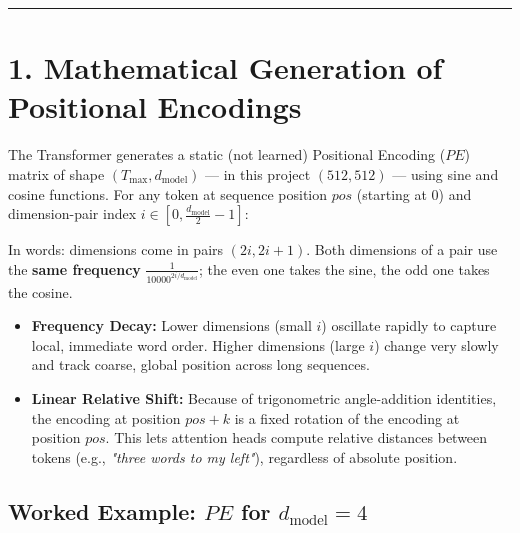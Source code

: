 \documentclass[11pt,a4paper,oneside]{report}
\providecommand{\tightlist}{\setlength{\itemsep}{0pt}\setlength{\parskip}{0pt}}
\begin{document}
\begin{center}\rule{0.5\linewidth}{0.5pt}\end{center}

\section{1. Mathematical Generation of Positional Encodings}\label{1-mathematical-generation-of-positional-encodings}

The Transformer generates a static (not learned) Positional Encoding (\(PE\)) matrix of shape \((T_{\max}, d_{\text{model}})\) --- in this project \((512, 512)\) --- using sine and cosine functions. For any token at sequence position \(pos\) (starting at \(0\)) and dimension-pair index \(i \in \left[0, \frac{d_{\text{model}}}{2} - 1\right]\):

\begin{center}\end{center}

\begin{center}\end{center}

In words: dimensions come in pairs \((2i, 2i+1)\). Both dimensions of a pair use the \textbf{same frequency} \(\frac{1}{10000^{2i/d_{\text{model}}}}\); the even one takes the sine, the odd one takes the cosine.

\begin{itemize}
\tightlist
\item
  \textbf{Frequency Decay:} Lower dimensions (small \(i\)) oscillate rapidly to capture local, immediate word order. Higher dimensions (large \(i\)) change very slowly and track coarse, global position across long sequences.
\item
  \textbf{Linear Relative Shift:} Because of trigonometric angle-addition identities, the encoding at position \(pos + k\) is a fixed rotation of the encoding at position \(pos\). This lets attention heads compute relative distances between tokens (e.g., \emph{"three words to my left"}), regardless of absolute position.
\end{itemize}

\subsection{\texorpdfstring{Worked Example: \(PE\) for \(d_{\text{model}} = 4\)}{Worked Example: PE for d\_\{\textbackslash text\{model\}\} = 4}}\label{worked-example-pe-for-d_textmodel--4}
\end{document}
